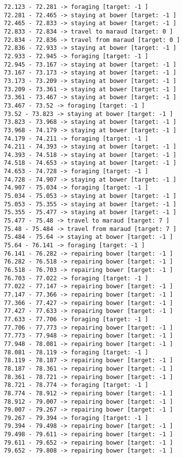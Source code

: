 \documentclass[11pt]{article}
\begin{document}
\begin{Verbatim}[commandchars=\\\{\}]
72.123 - 72.281 -> foraging [target: -1 ]
72.281 - 72.465 -> staying at bower [target: -1 ]
72.465 - 72.833 -> staying at bower [target: -1 ]
72.833 - 72.834 -> travel to maraud [target: 0 ]
72.834 - 72.836 -> travel from maraud [target: 0 ]
72.836 - 72.933 -> staying at bower [target: -1 ]
72.933 - 72.945 -> foraging [target: -1 ]
72.945 - 73.167 -> staying at bower [target: -1 ]
73.167 - 73.173 -> staying at bower [target: -1 ]
73.173 - 73.209 -> staying at bower [target: -1 ]
73.209 - 73.361 -> staying at bower [target: -1 ]
73.361 - 73.467 -> staying at bower [target: -1 ]
73.467 - 73.52 -> foraging [target: -1 ]
73.52 - 73.823 -> staying at bower [target: -1 ]
73.823 - 73.968 -> staying at bower [target: -1 ]
73.968 - 74.179 -> staying at bower [target: -1 ]
74.179 - 74.211 -> foraging [target: -1 ]
74.211 - 74.393 -> staying at bower [target: -1 ]
74.393 - 74.518 -> staying at bower [target: -1 ]
74.518 - 74.653 -> staying at bower [target: -1 ]
74.653 - 74.728 -> foraging [target: -1 ]
74.728 - 74.907 -> staying at bower [target: -1 ]
74.907 - 75.034 -> foraging [target: -1 ]
75.034 - 75.053 -> staying at bower [target: -1 ]
75.053 - 75.355 -> staying at bower [target: -1 ]
75.355 - 75.477 -> staying at bower [target: -1 ]
75.477 - 75.48 -> travel to maraud [target: 7 ]
75.48 - 75.484 -> travel from maraud [target: 7 ]
75.484 - 75.64 -> staying at bower [target: -1 ]
75.64 - 76.141 -> foraging [target: -1 ]
76.141 - 76.282 -> repairing bower [target: -1 ]
76.282 - 76.518 -> repairing bower [target: -1 ]
76.518 - 76.703 -> repairing bower [target: -1 ]
76.703 - 77.022 -> foraging [target: -1 ]
77.022 - 77.147 -> repairing bower [target: -1 ]
77.147 - 77.366 -> repairing bower [target: -1 ]
77.366 - 77.427 -> repairing bower [target: -1 ]
77.427 - 77.633 -> repairing bower [target: -1 ]
77.633 - 77.706 -> foraging [target: -1 ]
77.706 - 77.773 -> repairing bower [target: -1 ]
77.773 - 77.948 -> repairing bower [target: -1 ]
77.948 - 78.081 -> repairing bower [target: -1 ]
78.081 - 78.119 -> foraging [target: -1 ]
78.119 - 78.187 -> repairing bower [target: -1 ]
78.187 - 78.361 -> repairing bower [target: -1 ]
78.361 - 78.721 -> repairing bower [target: -1 ]
78.721 - 78.774 -> foraging [target: -1 ]
78.774 - 78.912 -> repairing bower [target: -1 ]
78.912 - 79.007 -> repairing bower [target: -1 ]
79.007 - 79.267 -> repairing bower [target: -1 ]
79.267 - 79.394 -> foraging [target: -1 ]
79.394 - 79.498 -> repairing bower [target: -1 ]
79.498 - 79.611 -> repairing bower [target: -1 ]
79.611 - 79.652 -> repairing bower [target: -1 ]
79.652 - 79.808 -> repairing bower [target: -1 ]

\end{Verbatim}
\end{document}
